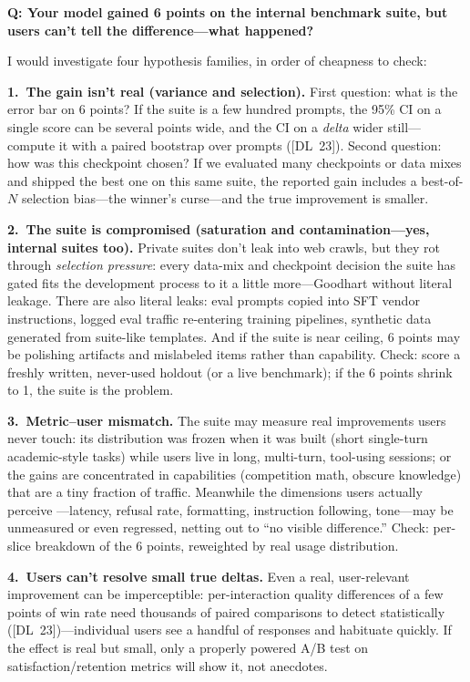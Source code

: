 \begin{interviewq}
\textbf{Q: Your model gained 6 points on the internal benchmark suite, but
users can't tell the difference---what happened?}

 \quad {} \quad \badgefreq{\freqhigh}

\stronganswer
I would investigate four hypothesis families, in order of cheapness to check:

\textbf{1.\ The gain isn't real (variance and selection).}
First question: what is the error bar on 6 points?  If the suite is a few
hundred prompts, the 95\% CI on a single score can be several points wide,
and the CI on a \emph{delta} wider still---compute it with a paired bootstrap
over prompts ([DL~23]).  Second question: how was this checkpoint chosen?  If
we evaluated many checkpoints or data mixes and shipped the best one on this
same suite, the reported gain includes a best-of-$N$ selection bias---the
winner's curse---and the true improvement is smaller.

\textbf{2.\ The suite is compromised (saturation and contamination---yes,
internal suites too).}
Private suites don't leak into web crawls, but they rot through
\emph{selection pressure}: every data-mix and checkpoint decision the suite
has gated fits the development process to it a little more---Goodhart without
literal leakage.  There are also literal leaks: eval prompts copied into SFT
vendor instructions, logged eval traffic re-entering training pipelines,
synthetic data generated from suite-like templates.  And if the suite is near
ceiling, 6 points may be polishing artifacts and mislabeled items rather than
capability.  Check: score a freshly written, never-used holdout (or a live
benchmark); if the 6 points shrink to 1, the suite is the problem.

\textbf{3.\ Metric--user mismatch.}
The suite may measure real improvements users never touch: its distribution
was frozen when it was built (short single-turn academic-style tasks) while
users live in long, multi-turn, tool-using sessions; or the gains are
concentrated in capabilities (competition math, obscure knowledge) that are a
tiny fraction of traffic.  Meanwhile the dimensions users actually perceive
---latency, refusal rate, formatting, instruction following, tone---may be
unmeasured or even regressed, netting out to ``no visible difference.''
Check: per-slice breakdown of the 6 points, reweighted by real usage
distribution.

\textbf{4.\ Users can't resolve small true deltas.}
Even a real, user-relevant improvement can be imperceptible: per-interaction
quality differences of a few points of win rate need thousands of paired
comparisons to detect statistically ([DL~23])---individual users see a
handful of responses and habituate quickly.  If the effect is real but small,
only a properly powered A/B test on satisfaction/retention metrics will show
it, not anecdotes.


\end{interviewq}
